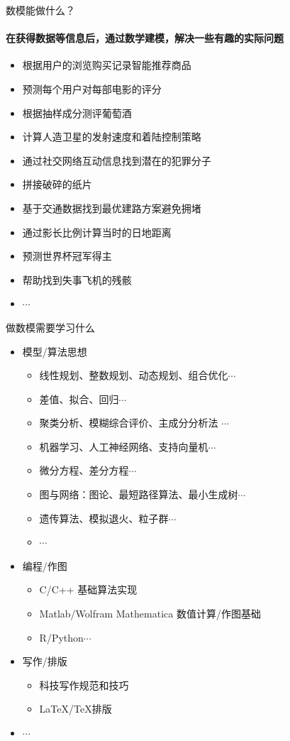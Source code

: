 \documentclass[xcolor={usenames,dvipsnames}]{beamer}
\begin{document}
\begin{frame}{数模能做什么？}
	\framesubtitle{在获得数据等信息后，通过数学建模，解决一些有趣的实际问题}
	\begin{itemize}
		\item 根据用户的浏览购买记录智能推荐商品
		\item 预测每个用户对每部电影的评分
		\item 根据抽样成分测评葡萄酒
		\item 计算人造卫星的发射速度和着陆控制策略
		\item 通过社交网络互动信息找到潜在的犯罪分子
		\item 拼接破碎的纸片
		\item 基于交通数据找到最优建路方案避免拥堵
		\item 通过影长比例计算当时的日地距离
		\item 预测世界杯冠军得主
		\item 帮助找到失事飞机的残骸
		\item $ \cdots $
	\end{itemize}
	
\end{frame}

\begin{frame}{做数模需要学习什么}\label{content}
	\begin{itemize}
	\item 模型/算法思想 
	
	\begin{itemize}
		\item 线性规划、整数规划、动态规划、组合优化$\cdots$
		\item 差值、拟合、回归$\cdots$
		\item 聚类分析、模糊综合评价、主成分分析法 $\cdots$
		\item 机器学习、人工神经网络、支持向量机$\cdots$
		\item 微分方程、差分方程$\cdots$
		\item 图与网络：图论、最短路径算法、最小生成树$\cdots$
		\item 遗传算法、模拟退火、粒子群$\cdots$
		\item $\cdots$
	\end{itemize}
	
	\item 编程/作图
	\begin{itemize}
		\item C/C++ 基础算法实现
		\item Matlab/Wolfram Mathematica 数值计算/作图基础
		\item R/Python$\cdots$
	\end{itemize}
	
	\item 写作/排版
	\begin{itemize}
		\item 科技写作规范和技巧
		\item  \LaTeX/\TeX 排版
	\end{itemize}
	\item $\cdots$
	\end{itemize}
	
\end{frame}
\end{document}
